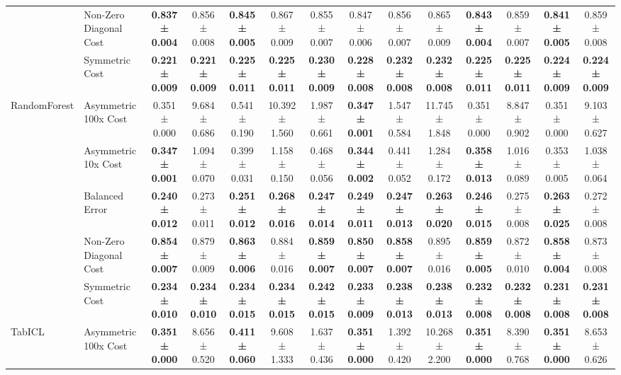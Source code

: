 \begin{table}[H]
{\begin{tabular}{llcccccccccccc}
 & Non-Zero Diagonal Cost & \textbf{0.837 ± 0.004} & 0.856 ± 0.008 & \textbf{0.845 ± 0.005} & 0.867 ± 0.009 & 0.855 ± 0.007 & 0.847 ± 0.006 & 0.856 ± 0.007 & 0.865 ± 0.009 & \textbf{0.843 ± 0.004} & 0.859 ± 0.007 & \textbf{0.841 ± 0.005} & 0.859 ± 0.008 \\
 & Symmetric Cost & \textbf{0.221 ± 0.009} & \textbf{0.221 ± 0.009} & \textbf{0.225 ± 0.011} & \textbf{0.225 ± 0.011} & \textbf{0.230 ± 0.009} & \textbf{0.228 ± 0.008} & \textbf{0.232 ± 0.008} & \textbf{0.232 ± 0.008} & \textbf{0.225 ± 0.011} & \textbf{0.225 ± 0.011} & \textbf{0.224 ± 0.009} & \textbf{0.224 ± 0.009} \\
\cline{1-14}
\multirow[t]{5}{*}{RandomForest} & Asymmetric 100x Cost & 0.351 ± 0.000 & 9.684 ± 0.686 & 0.541 ± 0.190 & 10.392 ± 1.560 & 1.987 ± 0.661 & \textbf{0.347 ± 0.001} & 1.547 ± 0.584 & 11.745 ± 1.848 & 0.351 ± 0.000 & 8.847 ± 0.902 & 0.351 ± 0.000 & 9.103 ± 0.627 \\
 & Asymmetric 10x Cost & \textbf{0.347 ± 0.001} & 1.094 ± 0.070 & 0.399 ± 0.031 & 1.158 ± 0.150 & 0.468 ± 0.056 & \textbf{0.344 ± 0.002} & 0.441 ± 0.052 & 1.284 ± 0.172 & \textbf{0.358 ± 0.013} & 1.016 ± 0.089 & 0.353 ± 0.005 & 1.038 ± 0.064 \\
 & Balanced Error & \textbf{0.240 ± 0.012} & 0.273 ± 0.011 & \textbf{0.251 ± 0.012} & \textbf{0.268 ± 0.016} & \textbf{0.247 ± 0.014} & \textbf{0.249 ± 0.011} & \textbf{0.247 ± 0.013} & \textbf{0.263 ± 0.020} & \textbf{0.246 ± 0.015} & 0.275 ± 0.008 & \textbf{0.263 ± 0.025} & 0.272 ± 0.008 \\
 & Non-Zero Diagonal Cost & \textbf{0.854 ± 0.007} & 0.879 ± 0.009 & \textbf{0.863 ± 0.006} & 0.884 ± 0.016 & \textbf{0.859 ± 0.007} & \textbf{0.850 ± 0.007} & \textbf{0.858 ± 0.007} & 0.895 ± 0.016 & \textbf{0.859 ± 0.005} & 0.872 ± 0.010 & \textbf{0.858 ± 0.004} & 0.873 ± 0.008 \\
 & Symmetric Cost & \textbf{0.234 ± 0.010} & \textbf{0.234 ± 0.010} & \textbf{0.234 ± 0.015} & \textbf{0.234 ± 0.015} & \textbf{0.242 ± 0.015} & \textbf{0.233 ± 0.009} & \textbf{0.238 ± 0.013} & \textbf{0.238 ± 0.013} & \textbf{0.232 ± 0.008} & \textbf{0.232 ± 0.008} & \textbf{0.231 ± 0.008} & \textbf{0.231 ± 0.008} \\
\cline{1-14}
\multirow[t]{5}{*}{TabICL} & Asymmetric 100x Cost & \textbf{0.351 ± 0.000} & 8.656 ± 0.520 & \textbf{0.411 ± 0.060} & 9.608 ± 1.333 & 1.637 ± 0.436 & \textbf{0.351 ± 0.000} & 1.392 ± 0.420 & 10.268 ± 2.200 & \textbf{0.351 ± 0.000} & 8.390 ± 0.768 & \textbf{0.351 ± 0.000} & 8.653 ± 0.626 \\

\end{tabular}}
\end{table}
